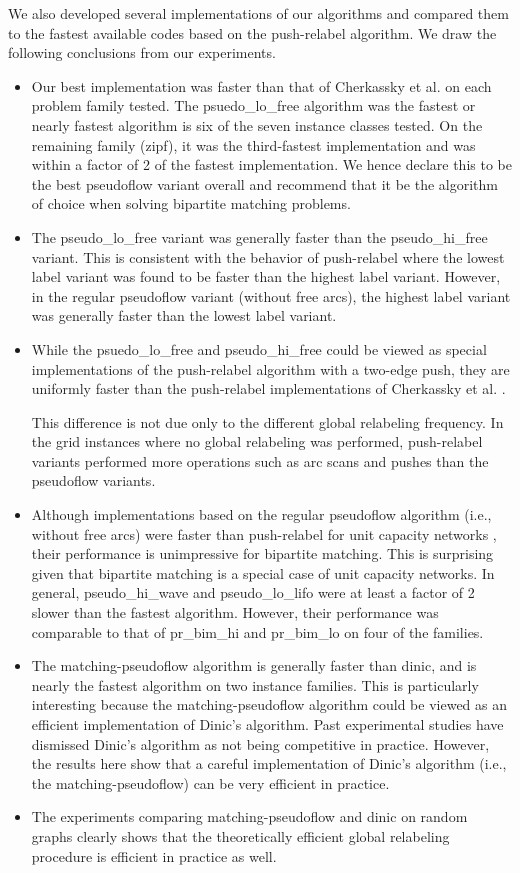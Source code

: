 \documentclass{article}
\begin{document}
We also developed several implementations of our algorithms and compared them to the fastest available codes based on the push-relabel algorithm. We draw the following conclusions from our experiments.
\begin{itemize}
\item Our best implementation was faster than that of Cherkassky et al. \cite{CheGMSS98} on each problem family tested.  The {\sf psuedo\_lo\_free} algorithm was the fastest or nearly fastest algorithm is six of the seven instance classes tested.  On the remaining family ({\sf zipf}), it was the third-fastest implementation and was within a factor of 2 of the fastest implementation.  We hence declare this to be the best pseudoflow variant overall and recommend that it be the algorithm of choice when solving bipartite matching problems.
\item The {\sf pseudo\_lo\_free} variant was generally faster than the {\sf pseudo\_hi\_free} variant.  This is consistent with the behavior of push-relabel where the lowest label variant was found to be faster than the highest label variant.  However, in the regular pseudoflow variant (without free arcs), the highest label variant was generally faster than the lowest label variant.
\item While the {\sf psuedo\_lo\_free} and {\sf pseudo\_hi\_free} could be viewed as special implementations of the push-relabel algorithm with a two-edge push, they are uniformly faster than the push-relabel implementations of Cherkassky et al. \cite{CheGMSS98}.

This difference is not due only to the different global relabeling frequency.  In the {\sf grid} instances where no global relabeling was performed, push-relabel variants performed more operations such as arc scans and pushes than the pseudoflow variants.
\item Although implementations based on the regular pseudoflow algorithm (i.e., without free arcs) were faster than push-relabel for unit capacity networks \cite{Cha07}, their performance is unimpressive for bipartite matching.  This is surprising given that bipartite matching is a special case of unit capacity networks.  In general, {\sf pseudo\_hi\_wave} and {\sf pseudo\_lo\_lifo} were at least a factor of 2 slower than the fastest algorithm.  However, their performance was comparable to that of {\sf pr\_bim\_hi} and {\sf pr\_bim\_lo} on four of the families.
\item The {\sf matching-pseudoflow} algorithm is generally faster than {\sf dinic}, and is nearly the fastest algorithm on two instance families.  This is particularly interesting because the {\sf matching-pseudoflow} algorithm could be viewed as an efficient implementation of Dinic's algorithm.  Past experimental studies \cite{Set93, Set96, CheGMSS98} have dismissed Dinic's algorithm as not being competitive in practice.  However, the results here show that a careful implementation of Dinic's algorithm (i.e., the {\sf matching-pseudoflow}) can be very efficient in practice.
\item The experiments comparing {\sf matching-pseudoflow} and {\sf dinic} on random graphs clearly shows that the theoretically efficient global relabeling procedure is efficient in practice as well.


\end{itemize}
\end{document}
